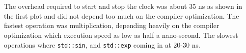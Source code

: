 \documentclass[preprint,notitlepage,nofootinbib]{revtex4-1}
\begin{document}
\begin{figure}[h]
\ContinuedFloat
\centering
  \\
\end{figure}\\
\indent The overhead required to start and stop the clock was about 35 ns as shown in the first plot and did not depend too much on the compiler optimization. The fastest operation was multiplication, depending heavily on the compiler optimization which execution speed as low as half a nano-second. The slowest operations where \verb|std::sin|, and \verb|std::exp| coming in at 20-30 ns.
\clearpage
\end{document}
